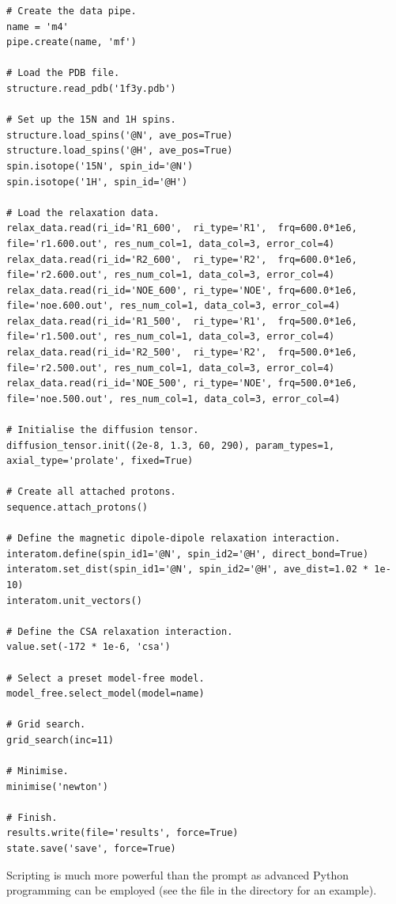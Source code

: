 \begin{lstlisting}
# Create the data pipe.
name = 'm4'
pipe.create(name, 'mf')

# Load the PDB file.
structure.read_pdb('1f3y.pdb')

# Set up the 15N and 1H spins.
structure.load_spins('@N', ave_pos=True)
structure.load_spins('@H', ave_pos=True)
spin.isotope('15N', spin_id='@N')
spin.isotope('1H', spin_id='@H')

# Load the relaxation data.
relax_data.read(ri_id='R1_600',  ri_type='R1',  frq=600.0*1e6, file='r1.600.out', res_num_col=1, data_col=3, error_col=4)
relax_data.read(ri_id='R2_600',  ri_type='R2',  frq=600.0*1e6, file='r2.600.out', res_num_col=1, data_col=3, error_col=4)
relax_data.read(ri_id='NOE_600', ri_type='NOE', frq=600.0*1e6, file='noe.600.out', res_num_col=1, data_col=3, error_col=4)
relax_data.read(ri_id='R1_500',  ri_type='R1',  frq=500.0*1e6, file='r1.500.out', res_num_col=1, data_col=3, error_col=4)
relax_data.read(ri_id='R2_500',  ri_type='R2',  frq=500.0*1e6, file='r2.500.out', res_num_col=1, data_col=3, error_col=4)
relax_data.read(ri_id='NOE_500', ri_type='NOE', frq=500.0*1e6, file='noe.500.out', res_num_col=1, data_col=3, error_col=4)

# Initialise the diffusion tensor.
diffusion_tensor.init((2e-8, 1.3, 60, 290), param_types=1, axial_type='prolate', fixed=True)

# Create all attached protons.
sequence.attach_protons()

# Define the magnetic dipole-dipole relaxation interaction.
interatom.define(spin_id1='@N', spin_id2='@H', direct_bond=True)
interatom.set_dist(spin_id1='@N', spin_id2='@H', ave_dist=1.02 * 1e-10)
interatom.unit_vectors()

# Define the CSA relaxation interaction.
value.set(-172 * 1e-6, 'csa')

# Select a preset model-free model.
model_free.select_model(model=name)

# Grid search.
grid_search(inc=11)

# Minimise.
minimise('newton')

# Finish.
results.write(file='results', force=True)
state.save('save', force=True)
\end{lstlisting}

Scripting is much more powerful than the prompt as advanced Python programming can be employed (see the file  in the  directory for an example).



